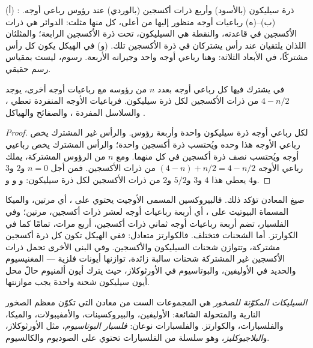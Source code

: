 \begin{omfigure}
{\small (أ) : ذرة سيليكون (بالأسود) وأربع
ذرات أكسجين (بالوردي) عند رؤوس رباعي أوجه. (ب)--(ه) رباعيات أوجه منظور إليها
من أعلى، كل منها مثلث: الدوائر هي ذرات الأكسجين في قاعدته،
والنقطة هي السيليكون، تحت ذرة الأكسجين الرابعة؛ والمثلثان اللذان يلتقيان عند رأس
يشتركان في ذرة الأكسجين تلك. (و) في الهيكل يكون كل رأس مشتركًا، في الأبعاد
الثلاثة: وهنا رباعي أوجه واحد وجيرانه الأربعة. رسوم، ليست بمقياس
رسم حقيقي.}
\end{omfigure}

\begin{proposition}\label{prop:g11:minerals:sharing}
في  يشترك فيها كل رباعي أوجه بعدد $n$ من رؤوسه مع رباعيات
أوجه أخرى، يوجد $4 - n/2$ من ذرات الأكسجين لكل ذرة سيليكون. فرباعيات
الأوجه المنفردة تعطي ، والسلاسل المفردة ، والصفائح 
والهياكل .
\end{proposition}

\begin{proof}
لكل رباعي أوجه ذرة سيليكون واحدة وأربعة رؤوس. والرأس غير
المشترك يخص رباعي الأوجه هذا وحده ويُحتسب ذرة أكسجين واحدة؛ والرأس
المشترك يخص رباعيي أوجه ويُحتسب نصف ذرة أكسجين في كل منهما. ومع
$n$ من الرؤوس المشتركة، يملك رباعي الأوجه $(4 - n) + n/2 = 4 - n/2$ من ذرات الأكسجين.
فمن أجل $n = 0$ و$2$ و$3$ و$4$ يعطي هذا $4$ و$3$ و$5/2$ و$2$ من ذرات الأكسجين
لكل ذرة سيليكون:  و و و.
\end{proof}

صيغ المعادن تؤكد ذلك. فالبيروكسين المسمى الأوجيت يحتوي على
، أي  مرتين، والميكا المسماة البيوتيت على ،
أي أربعة رباعيات أوجه لعشر ذرات أكسجين،  مرتين؛ وفي الفلسبار، تضم أربعة
رباعيات أوجه ثماني ذرات أكسجين،  أربع مرات، تمامًا كما في الكوارتز.
أما الشحنات فتختلف. فالكوارتز متعادل: ففي الهيكل تكون كل ذرة أكسجين
مشتركة، وتتوازن شحنات السيليكون والأكسجين. وفي البنى
الأخرى تحمل ذرات الأكسجين غير المشتركة شحنات سالبة زائدة، توازنها
أيونات فلزية --- المغنيسيوم والحديد في الأوليفين، والبوتاسيوم في الأورثوكلاز، حيث
يترك أيون ألمنيوم  حالّ محل أيون سيليكون 
شحنة واحدة يجب موازنتها.

\begin{definition}\label{def:g11:minerals:rock-forming}
\emph{السيليكات المكوّنة للصخور} هي المجموعات الست
من معادن  التي تكوّن معظم الصخور النارية
والمتحولة الشائعة: الأوليفين، والبيروكسينات، والأمفيبولات، والميكا،
والفلسبارات، والكوارتز. والفلسبارات نوعان: \emph{فلسبار
البوتاسيوم}، مثل الأورثوكلاز، و\emph{البلاجيوكليز}، وهو سلسلة من
الفلسبارات تحتوي على الصوديوم والكالسيوم.
\end{definition}


